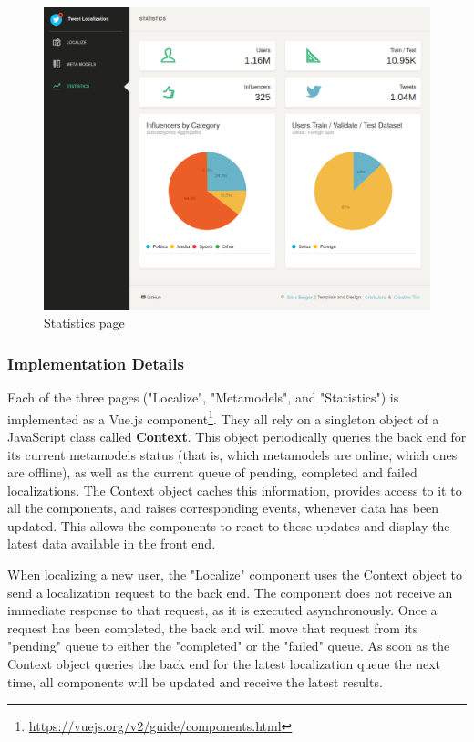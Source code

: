 \documentclass[10pt,a4paper]{article}
\begin{document}
\begin{figure}
	\centering
	\includegraphics[scale=0.3]{statistics}
	\caption{Statistics page}
	\label{fig:statistics}
\end{figure}

\subsubsection{Implementation Details}
Each of the three pages ("Localize", "Metamodels", and "Statistics") is implemented as a Vue.js component\footnote{\href{https://vuejs.org/v2/guide/components.html}{https://vuejs.org/v2/guide/components.html}}. They all rely on a singleton object of a JavaScript class called \textbf{Context}. This object periodically queries the back end for its current metamodels status (that is, which metamodels are online, which ones are offline), as well as the current queue of pending, completed and failed localizations. The Context object caches this information, provides access to it to all the components, and raises corresponding events, whenever data has been updated. This allows the components to react to these updates and display the latest data available in the front end.

When localizing a new user, the "Localize" component uses the Context object to send a localization request to the back end. The component does not receive an immediate response to that request, as it is executed asynchronously. Once a request has been completed, the back end will move that request from its "pending" queue to either the "completed" or the "failed" queue. As soon as the Context object queries the back end for the latest localization queue the next time, all components will be updated and receive the latest results.
\end{document}
